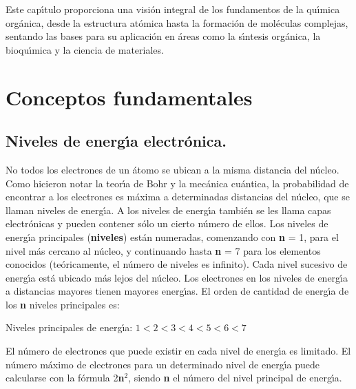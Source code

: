 Este cap\'{\i}tulo proporciona una visi\'on integral de los fundamentos de la qu\'{\i}mica org\'anica, desde la estructura at\'omica hasta la formaci\'on de mol\'eculas complejas, sentando las bases para su aplicaci\'on en \'areas como la s\'{\i}ntesis org\'anica, la bioqu\'{\i}mica y la ciencia de materiales.

\section{Conceptos fundamentales}\label{cfund}
\subsection{Niveles de energ\'{\i}a electr\'onica.}
No todos los electrones de un \'atomo se ubican a la misma distancia del n\'ucleo. Como hicieron notar la teor\'{\i}a de Bohr y la mec\'anica cu\'antica, la probabilidad de encontrar a los electrones es m\'axima a determinadas distancias del n\'ucleo, que se llaman niveles de energ\'{\i}a. A los niveles de energ\'{\i}a tambi\'en se les llama capas electr\'onicas y pueden contener s\'olo un cierto n\'umero de ellos. Los niveles de energ\'{\i}a principales (\textbf{\gls{niveles}}) est\'an numeradas, comenzando con \textbf{n} = 1, para el nivel m\'as cercano al n\'ucleo, y continuando hasta  \textbf{n} = 7 para los elementos conocidos  (te\'oricamente, el n\'umero de niveles es infinito). Cada nivel sucesivo de energ\'{\i}a est\'a ubicado m\'as lejos del n\'ucleo. Los electrones en los niveles de energ\'{\i}a a distancias mayores tienen mayores energ\'{\i}as. El orden de cantidad de energ\'{\i}a de los \textbf{n}  niveles principales es: 

Niveles principales de energ\'{\i}a: $1< 2 < 3 < 4 < 5 < 6< 7$

El n\'umero de electrones que puede existir en cada nivel de energ\'{\i}a es limitado. El n\'umero m\'aximo de electrones para un determinado nivel de energ\'{\i}a puede calcularse con la f\'ormula 2\textbf{n}$^2$, siendo \textbf{n} el n\'umero del nivel principal de  energ\'{\i}a.

